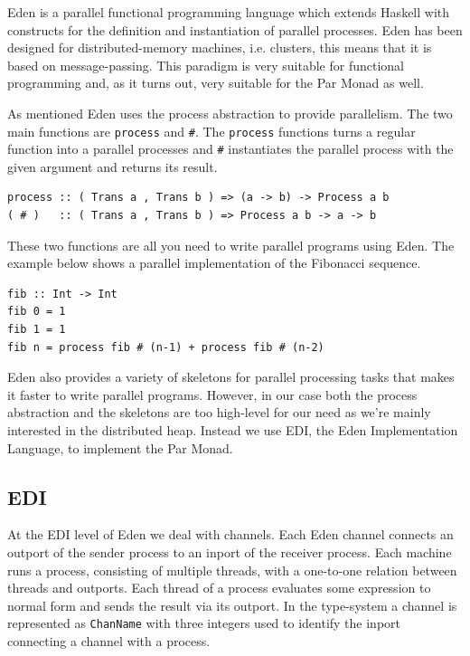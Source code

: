 \documentclass[a4paper, oneside, final]{memoir}
\begin{document}
Eden is a parallel functional programming language which extends
Haskell with constructs for the definition and instantiation of
parallel processes. Eden has been designed for distributed-memory
machines, i.e. clusters, this means that it is based on 
message-passing. This paradigm is very suitable for functional
programming and, as it turns out, very suitable for the Par Monad
as well. 

As mentioned Eden uses the process abstraction to provide parallelism.
The two main functions are \texttt{process} and \texttt{\#}. The
\texttt{process} functions turns a regular function into a parallel
processes and \texttt{\#} instantiates the parallel process with the
given argument and returns its result. \newline 

\begin{lstlisting}
process :: ( Trans a , Trans b ) => (a -> b) -> Process a b
( # )   :: ( Trans a , Trans b ) => Process a b -> a -> b
\end{lstlisting}

These two functions are all you need to write parallel programs using
Eden. The example below shows a parallel implementation of the
Fibonacci sequence. \newline

\begin{lstlisting}
fib :: Int -> Int
fib 0 = 1
fib 1 = 1
fib n = process fib # (n-1) + process fib # (n-2)
\end{lstlisting}

Eden also provides a variety of skeletons for parallel processing
tasks that makes it faster to write parallel programs. However, in
our case both the process abstraction and the skeletons are too 
high-level for our need as we're mainly interested in the distributed
heap. Instead we use EDI, the Eden Implementation Language, to
implement the Par Monad.

\subsection{EDI}
\label{sub:edi}

At the EDI level of Eden we deal with channels. Each Eden channel
connects an outport of the sender process to an inport of the receiver
process. Each machine runs a process, consisting of multiple threads,
with a one-to-one relation between threads and outports. Each thread
of a process evaluates some expression to normal form and sends the
result via its outport. In the type-system a channel is represented as
\texttt{ChanName} with three integers used to identify the inport
connecting a channel with a process. \newline
\end{document}
